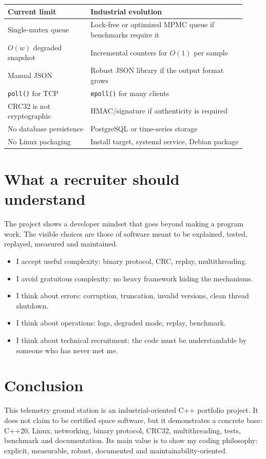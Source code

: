 \documentclass[10pt,a4paper]{article}
\begin{document}
\begin{longtable}{@{}p{0.32\linewidth}p{0.60\linewidth}@{}}
\toprule
Current limit & Industrial evolution \\
\midrule
Single-mutex queue & Lock-free or optimized MPMC queue if benchmarks require it \\
$O(w)$ degraded snapshot & Incremental counters for $O(1)$ per sample \\
Manual JSON & Robust JSON library if the output format grows \\
\texttt{poll()} for TCP & \texttt{epoll()} for many clients \\
CRC32 is not cryptographic & HMAC/signature if authenticity is required \\
No database persistence & PostgreSQL or time-series storage \\
No Linux packaging & Install target, systemd service, Debian package \\
\bottomrule
\end{longtable}

\section{What a recruiter should understand}

The project shows a developer mindset that goes beyond making a program work. The visible choices are those of software meant to be explained, tested, replayed, measured and maintained.

\begin{itemize}
  \item I accept useful complexity: binary protocol, CRC, replay, multithreading.
  \item I avoid gratuitous complexity: no heavy framework hiding the mechanisms.
  \item I think about errors: corruption, truncation, invalid versions, clean thread shutdown.
  \item I think about operations: logs, degraded mode, replay, benchmark.
  \item I think about technical recruitment: the code must be understandable by someone who has never met me.
\end{itemize}

\section{Conclusion}

This telemetry ground station is an industrial-oriented C++ portfolio project. It does not claim to be certified space software, but it demonstrates a concrete base: C++20, Linux, networking, binary protocol, CRC32, multithreading, tests, benchmark and documentation. Its main value is to show my coding philosophy: explicit, measurable, robust, documented and maintainability-oriented.
\end{document}
